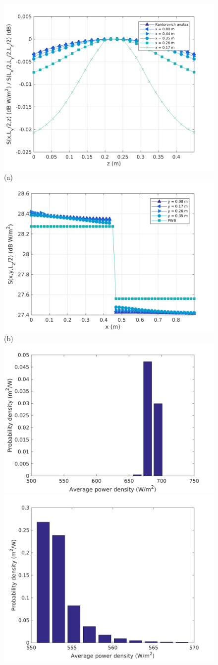 \documentclass[a4paper]{article}
\numberwithin{equation}{section}
\begin{document}
\begin{figure}[ht]
\begin{center}
\includegraphics[width=0.6\linewidth]{figures/DDM-EEBC_3D_DU_PowerDensityProfileZ}\\
{\footnotesize (a)}\\
\vspace{2mm}
\includegraphics[width=0.6\linewidth]{figures/DDM-EEBC_3D_DU_PowerDensityProfileX}\\
{\footnotesize (b)}\\
\vspace{2mm}
\includegraphics[width=0.45\linewidth]{figures/DDM-EEBC_3D_DU_PowerDensityPDF1}
\includegraphics[width=0.45\linewidth]{figures/DDM-EEBC_3D_DU_PowerDensityPDF2}

\end{center}
\end{figure}
\end{document}
